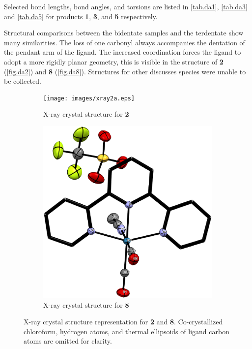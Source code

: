 

Selected bond lengths, bond angles, and torsions are listed in \autoref{tab.da1}, \autoref{tab.da3} and \autoref{tab.da5} for products \textbf{1}, \textbf{3}, and \textbf{5} respectively.






\FloatBarrier

Structural comparisons between the bidentate samples and the terdentate show many similarities. The loss of one carbonyl always accompanies the dentation of the pendant arm of the ligand. The increased coordination forces the ligand to adopt a more rigidly planar geometry, this is visible in the structure of \textbf{2} (\autoref{fig.da2}) and \textbf{8} (\autoref{fig.da8}). Structures for other discusses species were unable to be collected.

\begin{figure}[!ht]
 \centering
 \begin{subfigure}[b]{0.49\textwidth}
  \texttt{[image: images/xray2a.eps]}
  \caption{X-ray crystal structure for \textbf{2}}
  \label{fig.da2}
 \end{subfigure}
 \begin{subfigure}[b]{0.49\textwidth}
  \includegraphics[clip=true, width=\textwidth, keepaspectratio]{images/xray8a.eps}
  \caption{X-ray crystal structure for \textbf{8}}
  \label{fig.da8}
 \end{subfigure}
\caption[X-ray crystal structure representation for \textbf{2} and \textbf{8}.]{X-ray crystal structure representation for \textbf{2} and \textbf{8}. Co-crystallized chloroform, hydrogen atoms, and thermal ellipsoids of ligand carbon atoms are omitted for clarity.}
\label{fig.xrayter}
\end{figure} 

